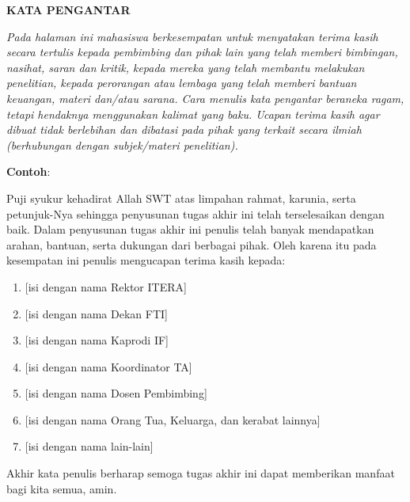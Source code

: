 \clearpage
{}%
\thispagestyle{fancy}
\begin{justifying}
	\large \bfseries \centering \MakeUppercase{Kata Pengantar}
	
	\normalsize \normalfont \justifying
	\textit{Pada halaman ini mahasiswa berkesempatan untuk menyatakan terima kasih secara tertulis kepada pembimbing dan pihak lain yang telah memberi bimbingan, nasihat, saran dan kritik, kepada mereka yang telah membantu melakukan penelitian, kepada perorangan atau lembaga yang telah memberi bantuan keuangan, materi dan/atau sarana. Cara menulis kata pengantar beraneka ragam, tetapi hendaknya menggunakan kalimat yang baku. Ucapan terima kasih agar dibuat tidak berlebihan dan dibatasi pada pihak yang terkait secara ilmiah (berhubungan dengan subjek/materi penelitian). } \par
	
	\textbf{Contoh}:\par
	Puji syukur kehadirat Allah SWT atas limpahan rahmat, karunia, serta petunjuk-Nya sehingga penyusunan tugas akhir ini telah terselesaikan dengan baik. Dalam penyusunan tugas akhir ini penulis telah banyak mendapatkan arahan, bantuan, serta dukungan dari berbagai pihak. Oleh karena itu pada kesempatan ini penulis mengucapan terima kasih kepada: \par
	\begin{enumerate}
		\item {[isi dengan nama Rektor ITERA]}
		\item {[isi dengan nama Dekan FTI]}
		\item {[isi dengan nama Kaprodi IF]}
		\item {[isi dengan nama Koordinator TA]}
		\item {[isi dengan nama Dosen Pembimbing]}
		\item {[isi dengan nama Orang Tua, Keluarga, dan kerabat lainnya]}
		\item {[isi dengan nama lain-lain]}
	\end{enumerate} \par
	Akhir kata penulis berharap semoga tugas akhir ini dapat memberikan manfaat bagi kita semua, amin. 
	\vfill
	
\end{justifying}
\clearpage
